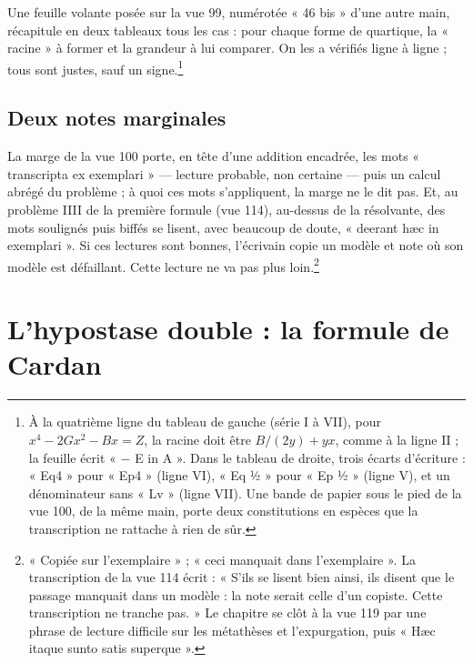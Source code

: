 \documentclass[11pt,a4paper]{article}
\begin{document}
Une feuille volante posée sur la vue 99, numérotée « 46 bis » d'une autre main,
récapitule en deux tableaux tous les cas : pour chaque forme de quartique, la
« racine » à former et la grandeur à lui comparer. On les a vérifiés ligne à
ligne ; tous sont justes, sauf un signe.\footnote{À la quatrième ligne du tableau
de gauche (série I à VII), pour $x^4 - 2Gx^2 - Bx = Z$, la racine doit être
$B/(2y) + yx$, comme à la ligne II ; la feuille écrit « $-$ E in A ». Dans le
tableau de droite, trois écarts d'écriture : « Eq4 » pour « Ep4 » (ligne VI),
« Eq ½ » pour « Ep ½ » (ligne V), et un dénominateur sans « Lv » (ligne VII). Une
bande de papier sous le pied de la vue 100, de la même main, porte deux
constitutions en espèces que la transcription ne rattache à rien de sûr.}

\subsection*{Deux notes marginales}

La marge de la vue 100 porte, en tête d'une addition encadrée, les mots
« transcripta ex exemplari » — lecture probable, non certaine — puis un calcul
abrégé du problème ; à quoi ces mots s'appliquent, la marge ne le dit pas. Et, au
problème IIII de la première formule (vue 114), au-dessus de la résolvante, des
mots soulignés puis biffés se lisent, avec beaucoup de doute, « deerant hæc in
exemplari ». Si ces lectures sont bonnes, l'écrivain copie un modèle et note où
son modèle est défaillant. Cette lecture ne va pas plus loin.\footnote{« Copiée
sur l'exemplaire » ; « ceci manquait dans l'exemplaire ». La transcription de la
vue 114 écrit : « S'ils se lisent bien ainsi, ils disent que le passage manquait
dans un modèle : la note serait celle d'un copiste. Cette transcription ne
tranche pas. » Le chapitre se clôt à la vue 119 par une phrase de lecture
difficile sur les métathèses et l'expurgation, puis « Hæc itaque sunto satis
superque ».}

\section*{L'hypostase double : la formule de Cardan}
\end{document}
